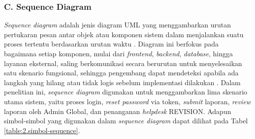 \subsubsection*{C. Sequence Diagram} \label{II.Sequence}
\textit{Sequence diagram} adalah jenis diagram UML yang menggambarkan urutan pertukaran pesan antar objek atau komponen sistem dalam menjalankan suatu proses tertentu berdasarkan urutan waktu \cite{alfedaghi2021sequence}. Diagram ini berfokus pada bagaimana setiap komponen, mulai dari \textit{frontend}, \textit{backend}, \textit{database}, hingga layanan eksternal, saling berkomunikasi secara berurutan untuk menyelesaikan satu skenario fungsional, sehingga pengembang dapat mendeteksi apabila ada langkah yang hilang atau tidak logis sebelum implementasi dilakukan \cite{alfedaghi2021sequence}. Dalam penelitian ini, \textit{sequence diagram} digunakan untuk menggambarkan lima skenario utama sistem, yaitu proses login, \textit{reset password} via token, \textit{submit} laporan, \textit{review} laporan oleh Admin Global, dan penanganan \textit{helpdesk} REVISION. Adapun simbol-simbol yang digunakan dalam \textit{sequence diagram} dapat dilihat pada Tabel \ref{table:2.simbol-sequence}. \par

